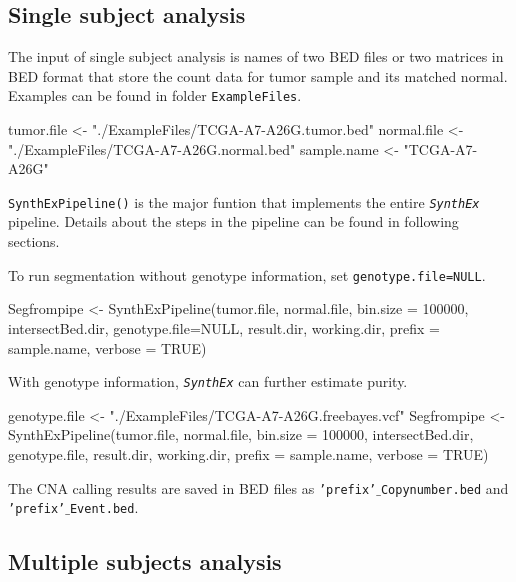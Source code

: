 \documentclass{article}
\newcommand{\pkg}[1]{\texttt{\textsl{#1}}}
\newcommand{\code}[1]{\texttt{#1}}
\begin{document}
\subsection{Single subject analysis}
The input of single subject analysis is names of two BED files or two matrices in BED format that store the count data for tumor sample and its matched normal. Examples can be found in folder \code{ExampleFiles}.
\begin{Schunk}
\begin{Sinput}
 tumor.file <- "./ExampleFiles/TCGA-A7-A26G.tumor.bed"
 normal.file <- "./ExampleFiles/TCGA-A7-A26G.normal.bed"
 sample.name <- "TCGA-A7-A26G"
\end{Sinput}
\end{Schunk}
\code{SynthExPipeline()} is the major funtion that implements the entire \pkg{SynthEx} pipeline. Details about the steps in the pipeline can be found in following sections.

To run segmentation without genotype information, set \code{genotype.file=NULL}.
\begin{Schunk}
\begin{Sinput}
 Segfrompipe <- SynthExPipeline(tumor.file, normal.file,
          bin.size = 100000, intersectBed.dir,
          genotype.file=NULL,
          result.dir, working.dir,
          prefix = sample.name,
          verbose = TRUE)
\end{Sinput}
\end{Schunk}

With genotype information, \pkg{SynthEx} can further estimate purity.
\begin{Schunk}
\begin{Sinput}
 genotype.file <- "./ExampleFiles/TCGA-A7-A26G.freebayes.vcf"
 Segfrompipe <- SynthExPipeline(tumor.file, normal.file,
     bin.size = 100000, intersectBed.dir,
     genotype.file, result.dir, working.dir,
     prefix = sample.name, verbose = TRUE)
\end{Sinput}
\end{Schunk}
The CNA calling results are saved in BED files as \code{'prefix'$\_$Copynumber.bed} and \code{'prefix'$\_$Event.bed}.

\subsection{Multiple subjects analysis}
\end{document}

